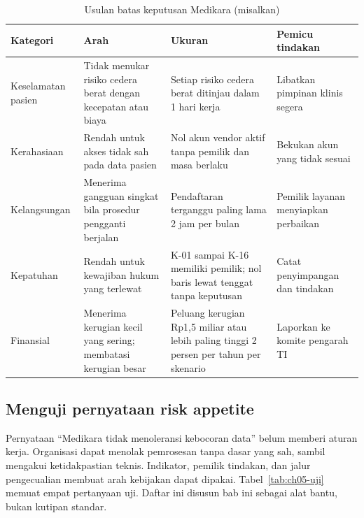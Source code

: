 \begin{table}[!htb]
  \centering\small
  \caption{Usulan batas keputusan Medikara (misalkan)}\label{tab:ch05-appetite}
  \begin{tabularx}{\textwidth}{|>{\raggedright\arraybackslash}p{}|>{\raggedright\arraybackslash}X|>{\raggedright\arraybackslash}X|>{\raggedright\arraybackslash}p{}|}
    \hline
    \textbf{Kategori} & \textbf{Arah} & \textbf{Ukuran} & \textbf{Pemicu tindakan} \\ \hline
    Keselamatan pasien & Tidak menukar risiko cedera berat dengan kecepatan atau biaya & Setiap risiko
    cedera berat ditinjau dalam 1 hari kerja & Libatkan pimpinan klinis segera \\ \hline
    Kerahasiaan & Rendah untuk akses tidak sah pada data pasien & Nol akun vendor aktif tanpa pemilik
    dan masa berlaku & Bekukan akun yang tidak sesuai \\ \hline
    Kelangsungan & Menerima gangguan singkat bila prosedur pengganti berjalan & Pendaftaran terganggu
    paling lama 2 jam per bulan & Pemilik layanan menyiapkan perbaikan \\ \hline
    Kepatuhan & Rendah untuk kewajiban hukum yang terlewat & K-01 sampai K-16 memiliki pemilik; nol
    baris lewat tenggat tanpa keputusan & Catat penyimpangan dan tindakan \\ \hline
    Finansial & Menerima kerugian kecil yang sering; membatasi kerugian besar & Peluang kerugian Rp1,5
    miliar atau lebih paling tinggi 2 persen per tahun per skenario & Laporkan ke komite pengarah TI
    \\ \hline
  \end{tabularx}
\end{table}

\subsection*{Menguji pernyataan risk appetite}

Pernyataan ``Medikara tidak menoleransi kebocoran data'' belum memberi aturan kerja. Organisasi dapat
menolak pemrosesan tanpa dasar yang sah, sambil mengakui ketidakpastian teknis. Indikator, pemilik
tindakan, dan jalur pengecualian membuat arah kebijakan dapat dipakai. Tabel~\ref{tab:ch05-uji}
memuat empat pertanyaan uji. Daftar ini disusun bab ini sebagai alat bantu, bukan kutipan standar.


